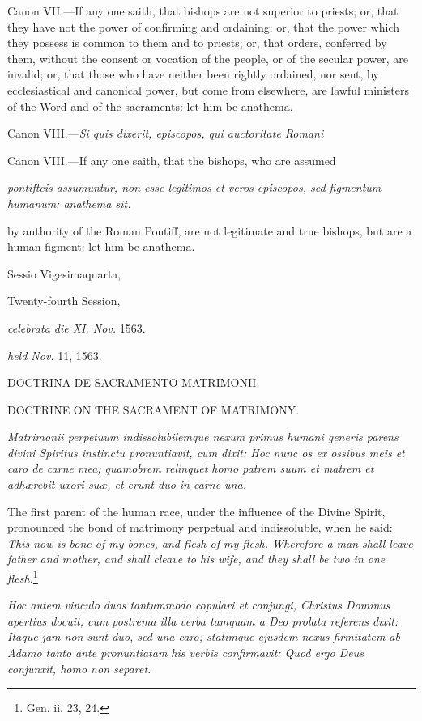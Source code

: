 Canon VII.—If any one saith, that bishops are not superior to priests; or, that they have not the power of confirming and ordaining: or, that the power which they possess is common to them and to priests; or, that orders, conferred by them, without the consent or vocation of the people, or of the secular power, are invalid; or, that those who have neither been rightly ordained, nor sent, by ecclesiastical and canonical power, but come from elsewhere, are lawful ministers of the Word and of the sacraments: let him be anathema.

Canon VIII.—\emph{Si quis dixerit, episcopos, qui auctoritate Romani }

Canon VIII.—If any one saith, that the bishops, who are assumed

\emph{pontiftcis assumuntur, non esse legitimos et veros episcopos, sed figmentum humanum: anathema sit.}

by authority of the Roman Pontiff, are not legitimate and true bishops, but are a human figment: let him be anathema.


Sessio Vigesimaquarta,

Twenty-fourth Session,

\emph{celebrata die XI. Nov.} 1563.

\emph{held Nov.} 11, 1563.

DOCTRINA DE SACRAMENTO MATRIMONII.

DOCTRINE ON THE SACRAMENT OF MATRIMONY.

\emph{Matrimonii perpetuum indissolubilemque nexum primus humani generis parens divini Spiritus instinctu pronuntiavit, cum dixit: Hoc nunc os ex ossibus meis et caro de carne mea; quamobrem relinquet homo patrem suum et matrem et adhærebit uxori suæ, et erunt duo in carne una.}

The first parent of the human race, under the influence of the Divine Spirit, pronounced the bond of matrimony perpetual and indissoluble, when he said: \emph{This now is bone of my bones, and flesh of my flesh. Wherefore a man shall leave father and mother, and shall cleave to his wife, and they shall be two in one flesh.}\footnote{\par   Gen. ii. 23, 24.}

\emph{Hoc autem vinculo duos tantummodo copulari et conjungi, Christus Dominus apertius docuit, cum postrema illa verba tamquam a Deo prolata referens dixit: Itaque jam non sunt duo, sed una caro; statimque ejusdem nexus firmitatem ab Adamo tanto ante pronuntiatam his verbis confirmavit: Quod ergo Deus conjunxit, homo non separet.}

